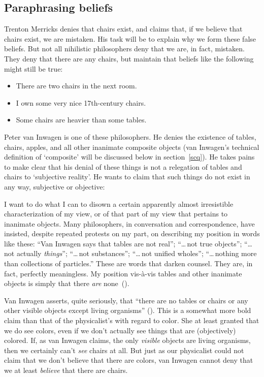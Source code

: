 \documentclass[11pt]{article}
\newenvironment{squote}{%
	\begin{spacing}{1}
	\begin{list}{}{%
	\setlength{\labelwidth}{0pt}%
	\rightmargin\leftmargin%
	}
	\item\relax
	}{%
	\end{list}%
	\end{spacing}
	}
\begin{document}
\begin{spacing}{1.5}
\subsection{Paraphrasing beliefs}
\label{paraphrase}
Trenton Merricks denies that chairs exist, and claims that, if we
believe that chairs exist, we are mistaken.  His task will be to
explain why we form these false beliefs.  But not all nihilistic
philosophers deny that we are, in fact, mistaken.  They deny that
there are any chairs, but maintain that beliefs like the following
might still be true:

\begin{itemize}
  \item There are two chairs in the next room.
  \item I own some very nice 17th-century chairs.
  \item Some chairs are heavier than some tables.
\end{itemize}

Peter van Inwagen is one of these philosophers.  He denies the
existence of tables, chairs, apples, and all other inanimate composite
objects (van Inwagen's technical definition of `composite' will be
discussed below in section~\ref{scq}).  He takes pains to make clear
that his denial of these things is not a relegation of tables and
chairs to `subjective reality'.  He wants to claim that such things do
not exist in any way, subjective or objective:
\begin{squote}
I want to do what I can to disown a certain apparently almost
irresistible characterization of my view, or of that part of my view
that pertains to inanimate objects.  Many philosophers, in
conversation and correspondence, have insisted, despite repeated
protests on my part, on describing my position in words like these:
``Van Inwagen says that tables are not real''; ``\ldots\,not true
objects''; ``\ldots\,not actually {\em things}''; ``\ldots\,not
substances''; ``\ldots\,not unified wholes''; ``\ldots\,nothing more
than collections of particles.''  These are words that darken counsel.
They are, in fact, perfectly meaningless.  My position vis-\`{a}-vis
tables and other inanimate objects is simply that there {\em are}
none~(\citeyear[99]{inwagen1995}).
\end{squote}

Van Inwagen asserts, quite seriously, that ``there are no tables or
chairs or any other visible objects except living organisms''
(\citeyear[1]{inwagen1995}).  This is a somewhat more bold claim than
that of the physicalist's with regard to color.  She at least granted
that we do see colors, even if we don't actually see things that are
(objectively) colored.  If, as van Inwagen claims, the only {\em
  visible} objects are living organisms, then we certainly can't {\em
  see} chairs at all.  But just as our physicalist could not claim
that we don't believe that there are colors, van Inwagen cannot deny
that we at least {\em believe} that there are chairs.


\end{spacing}
\end{document}
